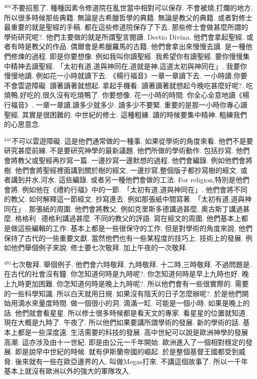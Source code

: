 \documentclass{book}
\begin{document}
$^{401}$不要招惹了.
種種因素令修道院在亂世當中相對可以保存.
不會被燒,打爛的地方.
所以很多時候那些典籍.
無論是古希臘哲學的典籍.
無論是教父的典籍.
或者對修士最重要的就是聖經的手稿.
都在這些修道院保存了下去.
那些修士會做甚麼所謂的學術研究呢?.
他們主要做的就是所謂聖言閱讀.
Dectio Divina.
他們會拿起聖經.
或者有時是教父的作品.
偶爾會是希臘羅馬的古籍.
他們會拿出來慢慢去讀.
是一種他們修煉的過程.
即是你要想像.
例如我叫你讀聖經.
我希望你有讀聖經.
要你慢慢集中精神去讀聖經.
「太初有道,道與神同在,道就是神,這道太初與神同在」.
我要你慢慢地讀.
例如花一小時就讀下去.
《楊行福音》一章一章讀下去.
一小時讀,你要不會雲遊障礙.
讀著讀著就想起.
拿起手機看.
讀著讀著就想起今晚吃甚麼好呢?.
吃燒鴨,好吃的,很久沒有吃燒鴨了.
你要想像.
花一小時的時間.
你全心全意地讀《楊行福音》.
一章一章讀,讀多少就多少.
讀多少不要緊.
重要的是那一小時你專心讀聖經.
其實是很困難的.
中世紀的修士.
這種粗練.
讀的時候要集中精神.
粗練我們的心思意念.

$^{441}$不可以雲遊障礙.
這是他們通常做的一種事.
如果從學術的角度來看.
他們不是要研究甚麼前線.
不是要研究神學的最新議題.
他們所做的學術動作.
包括抄寫.
他們會將教父或聖經再抄寫一篇.
一邊抄寫一邊默想的過程.
他們會編錄.
例如他們會將樹.
他們會將聖經裡面講到關於樹的經文.
一邊抄寫,整個版子都抄寫樹的經文.
或者講到井水,河水.
這些編錄.
或者另一種他們會做的工法.
For religion,特別是他們會將.
例如他在《禮約行福》中的一節.
「太初有道,道與神同在」.
他們會將不同的教父.
如何解釋這一節經文.
抄寫進去.
例如那張紙中間寫著.
「太初有道,道與神同在」.
那張紙的周圍.
他們會將教父.
例如克里斯多德講過甚麼.
奧古斯丁講過甚麼.
格格利·德格利講過甚麼.
不同的教父的評語.
寫在經文的周圍.
他們基本上都是做這些編輯的工作.
基本上都是一些很保守的工作.
但是對學術的角度來說.
他們保持了古代的一些重要文獻.
當然他們也有一些某程度的技巧上.
技術上的發展.
例如他們舉個例子來說.
修士要七次敬拜.
加上午夜的一次敬拜.

$^{481}$七次敬拜.
舉個例子.
他們會六時敬拜.
九時敬拜.
十二時,三時敬拜.
不過問題是.
在古代的社會沒有鐘.
你怎知道何時是九時呢?.
你怎知道何時是早上九時也好.
晚上九時更加困難.
你怎知道何時是晚上九時呢?.
所以他們會有一些很實際的.
需要的一些科學知識.
所以白天就用日規.
如果沒有陰天的日子怎麼辦呢?.
於是他們開始用滴水來量度時間.
做一個很小的洞.
滴滿一缸.
可能是一個小時.
如果是晚上的話.
他們就會看星星.
所以修士很多時候都是看天文的專家.
看星星的位置就知道.
現在大概是九時了.
午夜了.
所以他們如果要講所謂學術的發展.
新的學術的話.
基本上都是一些深度遠.
生活需要的科技的發展.
高中世紀可以說是歐洲神學的發展高潮.
這亦涉及由十一世紀.
即是由公元一千年開始.
歐洲進入了一個相對穩定的發展.
即是說早中世紀的時候.
就有伊斯蘭帝國的崛起.
於是整個基督王國都受到威脅.
後來就有一些在歐亞邊界的人.
叫做Megas打來.
不講這個故事了.
所以一千年基本上就沒有歐洲以外的強大的軍隊攻入.
\end{document}
